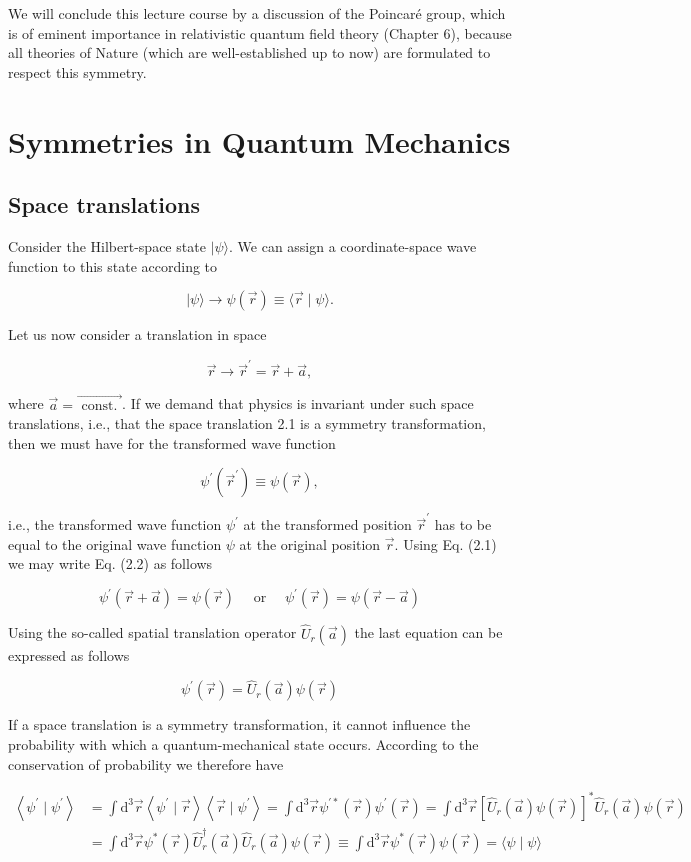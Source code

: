 \documentclass[10pt, letterpaper]{article}
\begin{document}
We will conclude this lecture course by a discussion of the Poincaré group, which is of eminent importance in relativistic quantum field theory (Chapter 6), because all theories of Nature (which are well-established up to now) are formulated to respect this symmetry.

\section{Symmetries in Quantum Mechanics}
\subsection{Space translations}
Consider the Hilbert-space state $|\psi\rangle$. We can assign a coordinate-space wave function to this state according to

$$
|\psi\rangle \longrightarrow \psi(\vec{r}) \equiv\langle\vec{r} \mid \psi\rangle .
$$

Let us now consider a translation in space

$$
\vec{r} \longrightarrow \vec{r}^{\prime}=\vec{r}+\vec{a},
$$

where $\vec{a}=\overrightarrow{\text { const. }}$. If we demand that physics is invariant under such space translations, i.e., that the space translation 2.1 is a symmetry transformation, then we must have for the transformed wave function

$$
\psi^{\prime}\left(\vec{r}^{\prime}\right) \equiv \psi(\vec{r}),
$$

i.e., the transformed wave function $\psi^{\prime}$ at the transformed position $\vec{r}^{\prime}$ has to be equal to the original wave function $\psi$ at the original position $\vec{r}$. Using Eq. (2.1) we may write Eq. (2.2) as follows

$$
\psi^{\prime}(\vec{r}+\vec{a})=\psi(\vec{r}) \quad \text { or } \quad \psi^{\prime}(\vec{r})=\psi(\vec{r}-\vec{a})
$$

Using the so-called spatial translation operator $\hat{U}_{r}(\vec{a})$ the last equation can be expressed as follows

$$
\psi^{\prime}(\vec{r})=\hat{U}_{r}(\vec{a}) \psi(\vec{r})
$$

If a space translation is a symmetry transformation, it cannot influence the probability with which a quantum-mechanical state occurs. According to the conservation of probability we therefore have

$$
\begin{aligned}
\left\langle\psi^{\prime} \mid \psi^{\prime}\right\rangle & =\int \mathrm{d}^{3} \vec{r}\left\langle\psi^{\prime} \mid \vec{r}\right\rangle\left\langle\vec{r} \mid \psi^{\prime}\right\rangle=\int \mathrm{d}^{3} \vec{r} \psi^{\prime *}(\vec{r}) \psi^{\prime}(\vec{r})=\int \mathrm{d}^{3} \vec{r}\left[\hat{U}_{r}(\vec{a}) \psi(\vec{r})\right]^{*} \hat{U}_{r}(\vec{a}) \psi(\vec{r}) \\
& =\int \mathrm{d}^{3} \vec{r} \psi^{*}(\vec{r}) \hat{U}_{r}^{\dagger}(\vec{a}) \hat{U}_{r}(\vec{a}) \psi(\vec{r}) \equiv \int \mathrm{d}^{3} \vec{r} \psi^{*}(\vec{r}) \psi(\vec{r})=\langle\psi \mid \psi\rangle
\end{aligned}
$$
\end{document}
